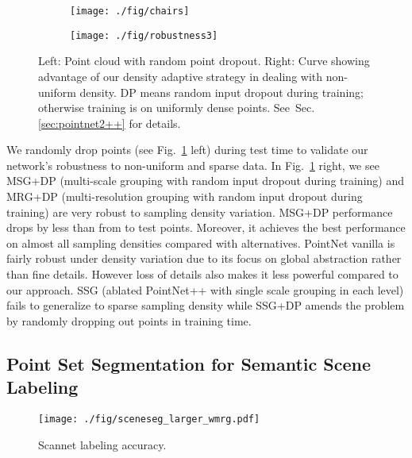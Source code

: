 \documentclass{article}
\begin{document}
\begin{figure}[t!]
\vspace{-0.5cm}
\centering
\begin{subfigure}
\centering
\texttt{[image: ./fig/chairs]}
\end{subfigure}
\begin{subfigure}
\centering
\texttt{[image: ./fig/robustness3]}
\end{subfigure}
\caption{Left: Point cloud with random point dropout. Right: Curve showing advantage of our density adaptive strategy in dealing with non-uniform density. DP means random input dropout during training; otherwise training is on uniformly dense points. See~Sec.\ref{sec:pointnet2++} for details.}
\label{fig:rb_classification}
\vspace{-0.5cm}
\end{figure}


We randomly drop points (see Fig.~\ref{fig:rb_classification} left) during test time to validate our network's robustness to non-uniform and sparse data.
In Fig.~\ref{fig:rb_classification} right, we see MSG+DP (multi-scale grouping with random input dropout during training) and MRG+DP (multi-resolution grouping with random input dropout during training) are very robust to sampling density variation. MSG+DP performance drops by less than  from  to  test points. Moreover, it achieves the best performance on almost all sampling densities compared with alternatives.
PointNet vanilla \cite{qi2016pointnet} is fairly robust under density variation due to its focus on global abstraction rather than fine details. However loss of details also makes it less powerful compared to our approach.
SSG (ablated PointNet++ with single scale grouping in each level) fails to generalize to sparse sampling density while SSG+DP amends the problem by randomly dropping out points in training time.


\vspace{-0.3cm}
\subsection{Point Set Segmentation for Semantic Scene Labeling}






\begin{wrapfigure}{R}{7cm}
  \vspace{-10pt}
  \begin{center}
    \texttt{[image: ./fig/sceneseg\_larger\_wmrg.pdf]}
  \end{center}  \vspace{-15pt}
  \caption{Scannet labeling accuracy. }
  \label{fig:sceneseg}
\end{wrapfigure}
\end{document}
